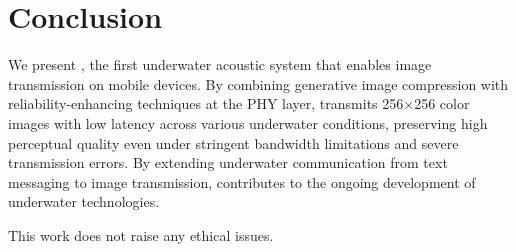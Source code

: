 \section{Conclusion}
\label{sec:conclusion}

We present \sysname, the first underwater acoustic system that enables
image transmission on mobile devices.
By combining generative image compression with reliability-enhancing techniques at the PHY layer,
\sysname transmits 256$\times$256 color images with low latency
across various underwater conditions,
preserving high perceptual quality even under stringent bandwidth limitations
and severe transmission errors.
By extending underwater communication from text messaging to image
transmission, \sysname contributes to the ongoing development of underwater
technologies.

 This work does not raise any ethical issues.

